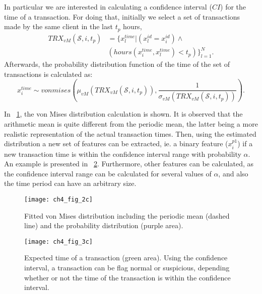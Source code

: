  In particular we are interested in calculating a confidence interval ($CI$)   for the time of a 
  transaction. For doing that, initially we select a set of transactions made by  the same client 
  in the last $t_p$ hours,
  \begin{align}\label{eq:4:pe_features1}
    TRX_{vM}(\mathcal{S},i, t_p) & = \bigg\{ x_l^{time} \bigg\vert   
    \left(x_l^{id}=x_i^{id}\right)\wedge \nonumber \\
    &\left(hours(x_i^{time},x_l^{time})< t_p\right)    \bigg\}_{l=1}^N.
  \end{align}
  Afterwards, the probability distribution function of the time of the set of transactions is 
  calculated as:
  \begin{equation}
   x_i^{time} \sim vonmises\left(\mu_{vM}(TRX_{vM}(\mathcal{S},i, t_p)), 
  \frac{1}{\sigma_{vM}(TRX_{vM}(\mathcal{S},i, t_p))} \right).
  \end{equation}
  
  
  In \figurename{~\ref{fig:4:von2}}, the von Mises distribution calculation is shown. It is 
observed that the arithmetic mean is quite different from the periodic  mean, the latter being a 
more realistic representation of the actual transaction times. Then, using the estimated 
distribution   a new set of features can be extracted, ie. a binary  
  feature ($x_i^{p1}$) if a new transaction time is within the confidence interval range with 
  probability   $\alpha$. An example is presented in \figurename{~\ref{fig:4:von3}}. 
  Furthermore, other features can be calculated, as the confidence interval range can be calculated 
  for several values of $\alpha$, and also the time period can have an arbitrary size.

  \begin{figure}[!t]
  \centering
  \texttt{[image: ch4\_fig\_2c]}
  \caption{Fitted von Mises distribution including the periodic mean (dashed line) and the 
    probability distribution (purple area).}
  \label{fig:4:von2}
  \end{figure} 
  
  \begin{figure}[!t]
  \centering
  \texttt{[image: ch4\_fig\_3c]}
  \caption{Expected time of a transaction (green area). Using     the confidence interval, a  
  transaction can be flag normal   or   suspicious, depending     whether or  not the time of 
  the   transaction is within the   confidence  interval.}
  \label{fig:4:von3}
  \end{figure} 
	


